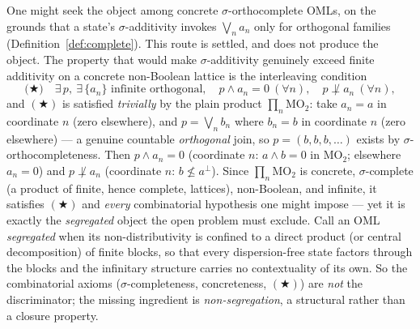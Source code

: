 \documentclass[11pt,reqno]{amsart}
\theoremstyle{plain}
\theoremstyle{definition}
\theoremstyle{remark}
\begin{document}
One might seek the object among concrete $\sigma$-orthocomplete OMLs,
on the grounds that a state's $\sigma$-additivity invokes $\bigvee_n a_n$ only
for orthogonal families (Definition~\ref{def:complete}). This route is
settled, and does not produce the object. The property that would
make $\sigma$-additivity genuinely exceed finite additivity on a concrete
non-Boolean lattice is the interleaving condition
\begin{equation}\label{eq:interleave}
\textbf{(}\bigstar\textbf{)}\quad
\exists\, p,\ \exists\,\{a_n\}\text{ infinite orthogonal},\quad
p \wedge a_n = 0\ (\forall n),\quad p \not\perp a_n\ (\forall n),
\end{equation}
and $(\bigstar)$ is satisfied \emph{trivially} by the plain product
$\prod_n \mathrm{MO}_2$: take $a_n = a$ in coordinate $n$ (zero elsewhere), and
$p = \bigvee_n b_n$ where $b_n = b$ in coordinate $n$ (zero elsewhere) --- a
genuine countable \emph{orthogonal} join, so $p=(b,b,b,\dots)$ exists by
$\sigma$-orthocompleteness. Then $p\wedge a_n=0$ (coordinate $n$: $a\wedge b=0$
in $\mathrm{MO}_2$; elsewhere $a_n=0$) and $p\not\perp a_n$ (coordinate $n$:
$b\not\leq a^\perp$). Since $\prod_n \mathrm{MO}_2$ is concrete, $\sigma$-complete
(a product of finite, hence complete, lattices), non-Boolean, and infinite, it
satisfies $(\bigstar)$ and \emph{every} combinatorial hypothesis one might
impose --- yet it is exactly the \emph{segregated} object the open problem must
exclude. Call an OML \emph{segregated} when its non-distributivity is confined to a
direct product (or central decomposition) of finite blocks, so that every
dispersion-free state factors through the blocks and the infinitary structure carries
no contextuality of its own. So the combinatorial axioms ($\sigma$-completeness,
concreteness, $(\bigstar)$) are \emph{not} the discriminator; the missing ingredient is
\emph{non-segregation}, a structural rather than a closure property.
\end{document}
